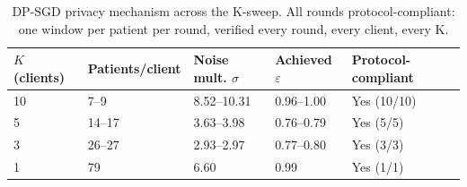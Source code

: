 \begin{table}[t]
\centering
\caption{DP-SGD privacy mechanism across the K-sweep. All rounds protocol-compliant: one window per patient per round, verified every round, every client, every K.}
\label{tab:m3-privacy-k-sweep}
\begin{tabular}{@{}lllll@{}}
\toprule
$K$ (clients) & Patients/client & Noise mult. $\sigma$ & Achieved $\varepsilon$ & Protocol-compliant \\
\midrule
10 & 7--9 & 8.52--10.31 & 0.96--1.00 & Yes (10/10) \\
5 & 14--17 & 3.63--3.98 & 0.76--0.79 & Yes (5/5) \\
3 & 26--27 & 2.93--2.97 & 0.77--0.80 & Yes (3/3) \\
1 & 79 & 6.60 & 0.99 & Yes (1/1) \\
\bottomrule
\end{tabular}
\end{table}
